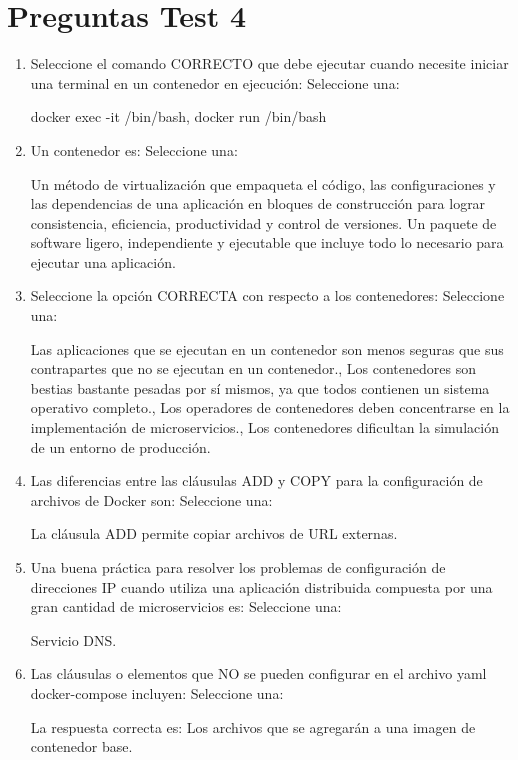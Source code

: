 \documentclass[12pt, twoside, openright]{report} %
\begin{document}
\section{Preguntas Test 4}
\begin{enumerate}
	\item Seleccione el comando CORRECTO que debe ejecutar cuando necesite iniciar una terminal en un contenedor en ejecución:
	      Seleccione una:

	      docker exec -it /bin/bash, docker run /bin/bash

	\item Un contenedor es:
	      Seleccione una:

	      Un método de virtualización que empaqueta el código, las configuraciones y las dependencias de una aplicación en bloques de construcción para lograr consistencia, eficiencia, productividad y control de versiones. Un paquete de software ligero, independiente y ejecutable que incluye todo lo necesario para ejecutar una aplicación.

	\item Seleccione la opción CORRECTA con respecto a los contenedores:
	      Seleccione una:

	      Las aplicaciones que se ejecutan en un contenedor son menos seguras que sus contrapartes que no se ejecutan en un contenedor., Los contenedores son bestias bastante pesadas por sí mismos, ya que todos contienen un sistema operativo completo., Los operadores de contenedores deben concentrarse en la implementación de microservicios., Los contenedores dificultan la simulación de un entorno de producción.

	\item Las diferencias entre las cláusulas ADD y COPY para la configuración de archivos de Docker son:
	      Seleccione una:

	      La cláusula ADD permite copiar archivos de URL externas.

	\item Una buena práctica para resolver los problemas de configuración de direcciones IP cuando utiliza una aplicación distribuida compuesta por una gran cantidad de microservicios es:
	      Seleccione una:

	      Servicio DNS.

	\item Las cláusulas o elementos que NO se pueden configurar en el archivo yaml docker-compose incluyen:
	      Seleccione una:

	      La respuesta correcta es: Los archivos que se agregarán a una imagen de contenedor base.


\end{enumerate}
\end{document}

